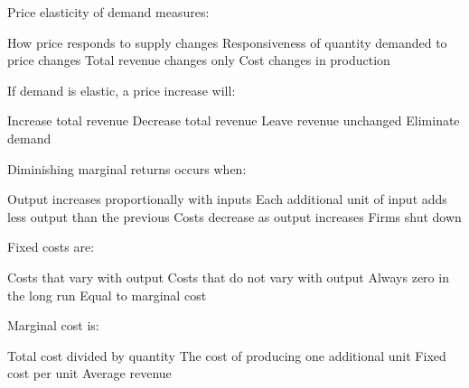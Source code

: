 \documentclass[12pt]{exam}
\begin{document}
\begin{questions}
    \begin{mcquestion}[2]
        Price elasticity of demand measures:
        \begin{choices}
            \choice How price responds to supply changes
            \CorrectChoice Responsiveness of quantity demanded to price changes
            \choice Total revenue changes only
            \choice Cost changes in production
        \end{choices}
    \end{mcquestion}

    \begin{mcquestion}[2]
        If demand is elastic, a price increase will:
        \begin{choices}
            \choice Increase total revenue
            \CorrectChoice Decrease total revenue
            \choice Leave revenue unchanged
            \choice Eliminate demand
        \end{choices}
    \end{mcquestion}

    \begin{mcquestion}[2]
        Diminishing marginal returns occurs when:
        \begin{choices}
            \choice Output increases proportionally with inputs
            \CorrectChoice Each additional unit of input adds less output than the previous
            \choice Costs decrease as output increases
            \choice Firms shut down
        \end{choices}
    \end{mcquestion}

    \begin{mcquestion}[2]
        Fixed costs are:
        \begin{choices}
            \choice Costs that vary with output
            \CorrectChoice Costs that do not vary with output
            \choice Always zero in the long run
            \choice Equal to marginal cost
        \end{choices}
    \end{mcquestion}

    \begin{mcquestion}[2]
        Marginal cost is:
        \begin{choices}
            \choice Total cost divided by quantity
            \CorrectChoice The cost of producing one additional unit
            \choice Fixed cost per unit
            \choice Average revenue
        \end{choices}
    \end{mcquestion}


\end{questions}
\end{document}
